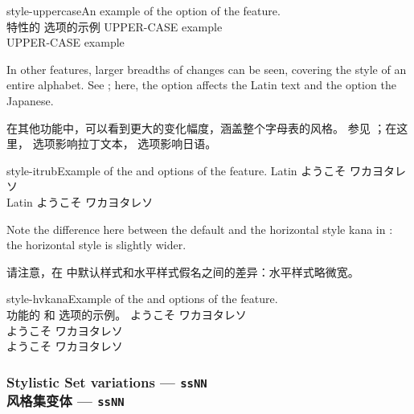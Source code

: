 \documentclass[a4paper]{l3doc}
\begin{document}
\begin{Lexample}{style-uppercase}{An example of the  option of the  feature.\\特性的  选项的示例}
   UPPER-CASE example \\
   UPPER-CASE example
\end{Lexample}


In other features, larger breadths of changes can be seen, covering
the style of an entire alphabet.
See ; here, the  option affects the Latin text
and the  option the Japanese.

在其他功能中，可以看到更大的变化幅度，涵盖整个字母表的风格。
参见 ；在这里， 选项影响拉丁文本， 选项影响日语。

\begin{Xexample}[firstline=2]{style-itrub}{Example of the  and  options of the  feature.}
  \Large \def\kana{ようこそ ワカヨタレソ}
   Latin \kana        \\
   Latin \kana
\end{Xexample}

Note the difference here between the default and the horizontal style kana
in : the horizontal style is slightly wider.

请注意，在  中默认样式和水平样式假名之间的差异：水平样式略微宽。

\begin{Xexample}[firstline=2]{style-hvkana}{Example of the  and  options of the  feature.\\ 功能的  和  选项的示例。}
  \Large \def\kana{ようこそ ワカヨタレソ}
    \kana   \\
  {
    \kana } \\
  {
    \kana }
\end{Xexample}


\subsubsection{Stylistic Set variations --- \texttt{ssNN}\\风格集变体 --- \texttt{ssNN}}
\label{sec:ot-ss}
\end{document}
